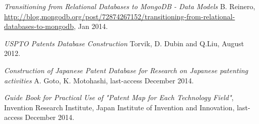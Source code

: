 \documentclass{article}
\begin{document}
\begin{thebibliography}{9}
  \emph{Transitioning from Relational Databases to MongoDB - Data Models}
  B. Reinero,
  \url{http://blog.mongodb.org/post/72874267152/transitioning-from-relational-databases-to-mongodb}, 
  Jan 2014.
  
  \emph{USPTO Patents Database Construction}
  Torvik, D. Dubin and Q.Liu, 
  August 2012.
 
  \emph{Construction of Japanese Patent Database for Research on Japanese patenting
activities}
  A. Goto, K. Motohashi,
 last-access December 2014.

  \emph{Guide Book for Practical Use of "Patent Map for Each Technology Field"},
  Invention Research Institute, Japan Institute of Invention and Innovation,
 last-access December 2014.
 
\end{thebibliography}
\end{document}
